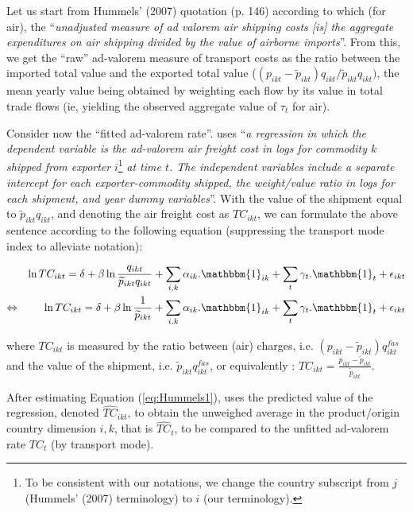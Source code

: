 \documentclass[a4paper,11pt]{article}
\begin{document}
Let us start from Hummels' (2007) quotation (p. 146) according to which (for air), the ``\textit{unadjusted measure of ad valorem air shipping costs [is] the aggregate expenditures on air shipping divided by the value of airborne imports}''. From this, we get the ``raw'' ad-valorem measure of transport costs as the ratio between the imported total value and the exported total value ($(p_{ikt} - \widetilde{p}_{ikt})q_{ikt}/\widetilde{p}_{ikt}q_{ikt})$, the mean yearly value being obtained by weighting each flow by its value in total trade flows (ie, yielding the observed aggregate value of $\tau_t$ for air).

Consider now the ``fitted ad-valorem rate''. \cite{hummels2007} uses ``\textit{a regression in which the dependent variable is the ad-valorem air freight cost in logs for commodity $k$ shipped from exporter} $i$\footnote{To be consistent with our notations, we change the country subscript from $j$ (Hummels' (2007) terminology) to $i$ (our terminology).} \textit{at time $t$. The independent variables include a separate intercept for each exporter-commodity shipped, the weight/value ratio in logs for each shipment, and year dummy variables}''. With the value of the shipment equal to $\widetilde{p}_{ikt}q_{ikt}$, and denoting the air freight cost as $TC_{ikt}$, we can formulate the above sentence according to the following equation (suppressing the transport mode index to alleviate notation):

\begin{eqnarray}
&&\ln TC_{ikt} = \delta+ \beta \ln \frac{q_{ikt}}{\widetilde{p}_{ikt}q_{ikt}} + \sum_{i,k}\alpha_{ik}.\mathbbm{1}_{ik}+ \sum_{t}\gamma_{t}.\mathbbm{1}_{t} + \epsilon_{ikt} \notag \\
\Leftrightarrow && \ln TC_{ikt} = \delta+ \beta \ln \frac{1}{\widetilde{p}_{ikt}} + \sum_{i,k}\alpha_{ik}.\mathbbm{1}_{ik}+ \sum_{t}\gamma_{t}.\mathbbm{1}_{t} + \epsilon_{ikt} \label{eq:Hummels1}
\end{eqnarray}

\noindent where $TC_{ikt}$ is measured by the ratio between (air) charges, i.e. $(p_{ikt} - \widetilde{p}_{ikt})q^{fas}_{ikt}$ and the value of the shipment, i.e. $\widetilde{p}_{ikt}q^{fas}_{ikt}$, or equivalently : $TC_{ikt} = \frac{p_{ikt} - \widetilde{p}_{ikt}}{\widetilde{p}_{ikt}}$.\medskip

After estimating Equation (\ref{eq:Hummels1}), \cite{hummels2007} uses the predicted value of the regression, denoted $\widehat{TC}_{ikt}$, to obtain the unweighed average in the product/origin country dimension $i,k$, that is $\widehat{TC}_{t}$, to be compared to the unfitted ad-valorem rate $TC_{t}$ (by transport mode).\medskip
\end{document}
